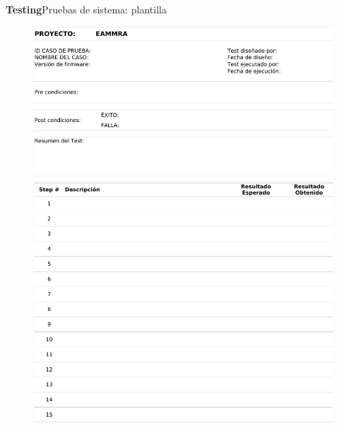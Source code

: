 \documentclass[11pt, xcolor={table,xcdraw}]{beamer}
\begin{document}
\begin{frame}{\textbf{\LARGE{Testing}}}{Pruebas de sistema: plantilla}
	\vspace{-.7cm}
	\begin{figure}[H]
		\includegraphics[width=1\textwidth]{./imagenes/UseCaseTemplate.pdf}
	\end{figure}	
\end{frame}
\end{document}
